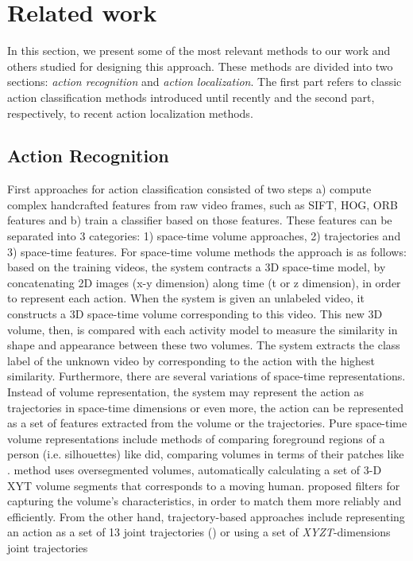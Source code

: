 \section{Related work}
In this section, we present some of the most relevant methods to our work and others studied for designing this approach. These methods
 are divided into two sections: \textit{action recognition} and \textit{action localization}. The first part refers to classic action classification methods introduced until recently and the second part, respectively, to recent action localization methods. 
\subsection{Action Recognition}
First approaches for action classification consisted of two steps a) compute complex handcrafted features from raw video frames,
such as SIFT, HOG, ORB features and b) train a classifier based on those features. These features can be separated into 3 categories:
1) space-time volume approaches, 2) trajectories and 3) space-time features. For space-time volume methods the approach is as follows:
based on the training videos, the system contracts a 3D space-time model, by concatenating 2D images (x-y dimension) along time (t or z dimension),
in order to represent each action. When the system is given an unlabeled video, it constructs a 3D space-time volume corresponding to this video.
This new 3D volume, then, is compared with each activity model to measure the similarity in shape and appearance between these two volumes.
The system extracts the class label of the unknown video by corresponding to the action with the highest similarity. Furthermore, there are
several variations of space-time representations. Instead of volume representation, the system may represent the action as trajectories
in space-time dimensions  or even more, the action can be represented as a set of features extracted from the volume or the trajectories.
Pure space-time volume representations include methods of comparing foreground regions of a person (i.e. silhouettes) like \cite{BobickAaron}
did, comparing volumes in terms of their patches like \cite{1467296}.  \cite{4270510} method uses oversegmented volumes, automatically
calculating a set of 3-D XYT volume segments that corresponds to a moving human. \cite{4587727} proposed filters for
capturing the volume's characteristics, in order to match them more reliably and efficiently. From the other hand, trajectory-based approaches
include representing an action as a set of 13 joint trajectories (\cite{1541250}) or using a set of \textit{XYZT}-dimensions joint trajectories
